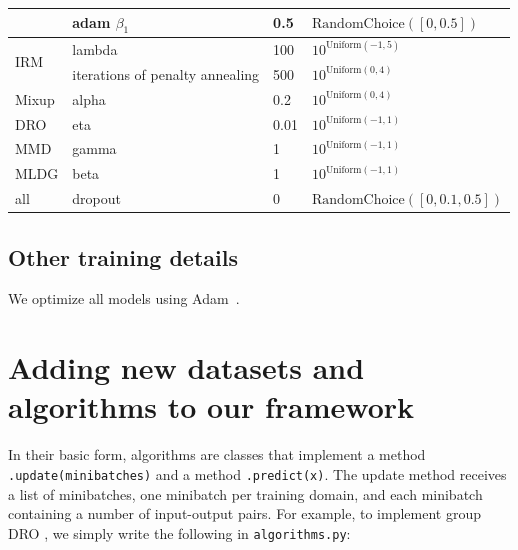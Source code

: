 \documentclass{article}
\begin{document}
\begin{table}[H]
\begin{center}
{\begin{tabular}{llll}
         & adam $\beta_1$             & 0.5    & $\text{RandomChoice}([0, 0.5])$\\
        \midrule
        \multirow{2}{*}{IRM}          & lambda  & 100    & $10^{\text{Uniform}(-1, 5)}$\\
                                      & iterations of penalty annealing & 500 & $10^{\text{Uniform}(0, 4)}$\\
        \midrule
        Mixup                         & alpha & 0.2 & $10^{\text{Uniform}(0, 4)}$\\
        \midrule
        DRO                           & eta   & 0.01 & $10^{\text{Uniform}(-1, 1)}$\\
        \midrule
        MMD                           & gamma & 1 & $10^{\text{Uniform}(-1, 1)}$\\
        \midrule
        MLDG           & beta & 1 & $10^{\text{Uniform}(-1, 1)}$\\
        \midrule
        all          & dropout & 0    & $\text{RandomChoice}([0, 0.1, 0.5])$\\
        \bottomrule
    \end{tabular}
    }
    \end{center}
    \label{table:hyperparameters}
\end{table}

\subsection{Other training details}

We optimize all models using Adam~\citep{kingma2014adam}.

\clearpage
\newpage
\section{Adding new datasets and algorithms to our framework}
\label{sec:code_example}

In their basic form, algorithms are classes that implement a method \texttt{.update(minibatches)} and a method \texttt{.predict(x)}.
%
The update method receives a list of minibatches, one minibatch per training domain, and each minibatch containing a number of input-output pairs. 
%
For example, to implement group DRO \citep[Algorithm 1]{sagawa2019distributionally}, we simply write the following in \texttt{algorithms.py}:

\end{document}
